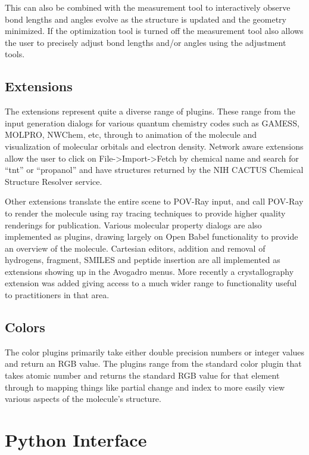 \documentclass[10pt]{bmc_article}
\newenvironment{bmcformat}{\begin{raggedright}
\baselineskip20pt\sloppy\setboolean{publ}{false}}{\end{raggedright}
\baselineskip20pt\sloppy}
\begin{document}
\begin{bmcformat}
This can also be combined with the measurement tool to interactively observe
bond lengths and angles evolve as the structure is updated and the geometry
minimized. If the optimization tool is turned off the measurement tool also
allows the user to precisely adjust bond lengths and/or angles using the
adjustment tools.

\subsection{Extensions}

The extensions represent quite a diverse range of plugins. These range from the
input generation dialogs for various quantum chemistry codes such as GAMESS,
MOLPRO, NWChem, etc, through to animation of the molecule and visualization of
molecular orbitals and electron density. Network aware extensions allow the user
to click on File->Import->Fetch by chemical name and search for ``tnt'' or
``propanol'' and have structures returned by the NIH CACTUS Chemical Structure
Resolver service.

Other extensions translate the entire scene to POV-Ray input, and call POV-Ray
to render the molecule using ray tracing techniques to provide higher quality
renderings for publication. Various molecular property dialogs are also
implemented as plugins, drawing largely on Open Babel functionality to provide
an overview of the molecule. Cartesian editors, addition and removal of
hydrogens, fragment, SMILES and peptide insertion are all implemented as
extensions showing up in the Avogadro menus. More recently a crystallography
extension was added giving access to a much wider range to functionality
useful to practitioners in that area.

\subsection{Colors} %

The color plugins primarily take either double precision numbers or integer
values and return an RGB value. The plugins range from the standard color
plugin that takes atomic number and returns the standard RGB value for that
element through to mapping things like partial change and index to more easily
view various aspects of the molecule's structure.

\section{Python Interface} %


\end{bmcformat}
\end{document}
